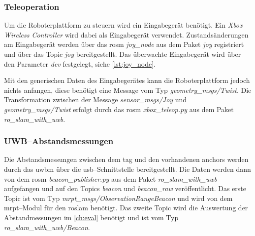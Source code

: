 \begin{comment}
--------------------------------------------------------------------------------
- \url{http://wiki.ros.org/joy}
- todo: Referenz auf das lst:joy_node stehen lassen?
\end{comment}
\subsubsection{Teleoperation}

Um die Roboterplattform zu steuern wird ein Eingabegerät benötigt. Ein \textit{Xbox Wireless Controller} wird dabei als Eingabegerät verwendet. Zustandsänderungen am Eingabegerät werden über das \Gls{rosm} \textit{joy\_node} aus dem Paket \textit{joy} registriert und über das Topic \textit{joy} bereitgestellt. Das überwachte Eingabegerät wird über den Parameter \textit{dev} festgelegt, siehe \autoref{lst:joy_node}.

Mit den generischen Daten des Eingabegerätes kann die Roboterplattform jedoch nichts anfangen, diese benötigt eine Message vom Typ \textit{geometry\_msgs/Twist}. Die Transformation zwischen der Message \textit{sensor\_msgs/Joy} und \textit{geometry\_msgs/Twist} erfolgt durch das \Gls{rosm} \textit{xbox\_teleop.py} aus dem Paket \textit{ro\_slam\_with\_uwb}.


\begin{comment}
--------------------------------------------------------------------------------
\end{comment}
\subsubsection{UWB--Abstandsmessungen}

Die Abstandsmessungen zwischen dem \Gls{tag} und den vorhandenen \Glspl{anchor} werden durch das \Gls{uwbm} über die \Gls{usb}--Schnittstelle bereitgestellt. Die Daten werden dann von dem \Gls{rosm} \textit{beacon\_publisher.py} aus dem Paket \textit{ro\_slam\_with\_uwb} aufgefangen und auf den Topics \textit{beacon} und \textit{beacon\_raw} veröffentlicht. Das erste Topic ist vom Typ \textit{mrpt\_msgs/ObservationRangeBeacon} und wird von dem \Gls{mrpt}--Modul für den \Gls{roslam} benötigt. Das zweite Topic wird die Auswertung der Abstandmessungen im \autoref{ch:eval} benötigt und ist vom Typ \textit{ro\_slam\_with\_uwb/Beacon}.


\begin{comment}
--------------------------------------------------------------------------------
\end{comment}
